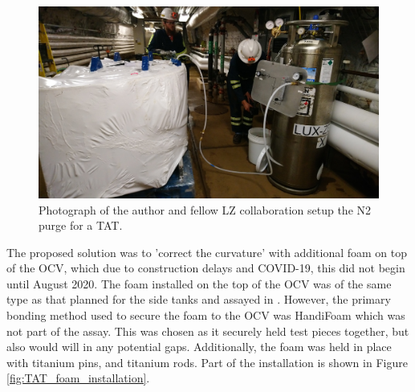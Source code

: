 \begin{figure}[!htbp]
\includegraphics[width=\textwidth]{Figures/Construction/TAT_purging.JPG}
\centering
\caption{Photograph of the author and fellow LZ collaboration setup the N2 purge for a TAT.}
\label{fig:TAT_purging}
\end{figure}

\par
The proposed solution was to 'correct the curvature' with additional foam on top of the OCV, which due to construction delays and COVID-19, this did not begin until August 2020.
The foam installed on the top of the OCV was of the same type as that planned for the side tanks and assayed in \cite{LZ_assay_ref}.
However, the primary bonding method used to secure the foam to the OCV was HandiFoam\textregistered \cite{handifoam_ref} which was not part of the assay.
This was chosen as it securely held test pieces together, but also would will in any potential gaps.
Additionally, the foam was held in place with titanium pins, and titanium rods.
Part of the installation is shown in Figure \ref{fig:TAT_foam_installation}.

